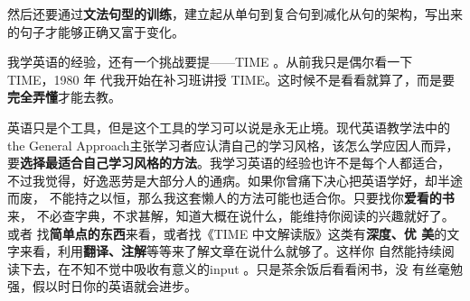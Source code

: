 然后还要通过\textbf{文法句型的训练}，建立起从单句到复合句到减化从句的架构，写出来
的句子才能够正确又富于变化。

我学英语的经验，还有一个挑战要提——TIME 。从前我只是偶尔看一下 TIME，1980 年
代我开始在补习班讲授 TIME。这时候不是看看就算了，而是要\textbf{完全弄懂}才能去教。

英语只是个工具，但是这个工具的学习可以说是永无止境。现代英语教学法中的the
General Approach主张学习者应认清自己的学习风格，该怎么学应因人而异，
要\textbf{选择最适合自己学习风格的方法}。我学习英语的经验也许不是每个人都适合，
不过我觉得，好逸恶劳是大部分人的通病。如果你曾痛下决心把英语学好，却半途而废，
不能持之以恒，那么我这套懒人的方法可能也适合你。只要找你\textbf{爱看的书}来，
不必查字典，不求甚解，知道大概在说什么，能维持你阅读的兴趣就好了。或者
找\textbf{简单点的东西}来看，或者找《TIME 中文解读版》这类有\textbf{深度、优
  美}的文字来看，利用\textbf{翻译、注解}等等来了解文章在说什么就够了。这样你
自然能持续阅读下去，在不知不觉中吸收有意义的input 。只是茶余饭后看看闲书，没
有丝毫勉强，假以时日你的英语就会进步。




